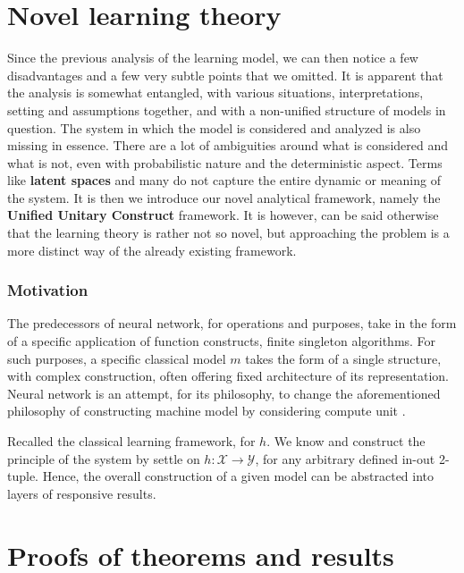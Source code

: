 \documentclass[10pt]{article}
\begin{document}
\clearpage
\section{Novel learning theory}
Since the previous analysis of the learning model, we can then notice a few disadvantages and a few very subtle points that we omitted. It is apparent that the analysis is somewhat entangled, with various situations, interpretations, setting and assumptions together, and with a non-unified structure of models in question. The system in which the model is considered and analyzed is also missing in essence. There are a lot of ambiguities around what is considered and what is not, even with probabilistic nature and the deterministic aspect. Terms like \textbf{latent spaces} and many do not capture the entire dynamic or meaning of the system. It is then we introduce our novel analytical framework, namely the \textbf{Unified Unitary Construct} framework. It is however, can be said otherwise that the learning theory is rather not so novel, but approaching the problem is a more distinct way of the already existing framework. 
\subsubsection{Motivation}
The predecessors of neural network, for operations and purposes, take in the form of a specific application of function constructs, finite singleton algorithms. For such purposes, a specific classical model $m$ takes the form of a single structure, with complex construction, often offering fixed architecture of its representation. Neural network is an attempt, for its philosophy, to change the aforementioned philosophy of constructing machine model by considering compute unit \cite{mcculloch_logical_1943,Rosenblatt1958ThePA}. 

Recalled the classical learning framework, for $h$. We know and construct the principle of the system by settle on $h:\mathcal{X}\to \mathcal{Y}$, for any arbitrary defined in-out 2-tuple. Hence, the overall construction of a given model can be abstracted into layers of responsive results. 

\clearpage

  

\clearpage

\appendix

\section{Proofs of theorems and results}
\end{document}
